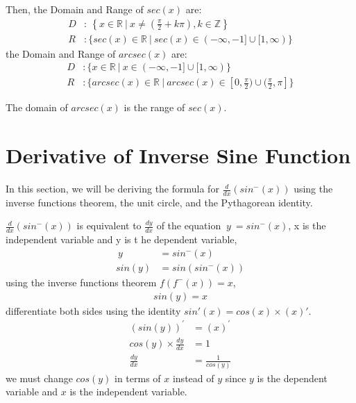 \documentclass[12pt, titlepage]{article}
\begin{document}
        Then, the Domain and Range of $\displaystyle sec( x)$ are:
            \begin{align*}
                D&:\ \left\{x\in \mathbb{R}\:|\:x\neq \left(\frac{\pi }{2} +k\pi \right) ,k\in \mathbb{Z}\right\}\\
                R&: \{sec(x)\in \mathbb{R}\:|\:sec(x)\in ( -\infty ,-1] \cup [ 1,\infty )\}
            \end{align*}
        the Domain and Range of $\displaystyle arcsec( x)$ are:
            \begin{align*}
                D&: \{x\in \mathbb{R}\:|\:x\in ( -\infty ,-1] \cup [ 1,\infty )\}\\
                R&: \{arcsec(x)\in \mathbb{R}\:|\:arcsec(x)\in [0,\frac{\pi}{2})\cup(\frac{\pi}{2},\pi]\}
            \end{align*}
            
        The domain of $arcsec(x)$ is the range of $sec(x)$.

\newpage
\section{Derivative of Inverse Sine Function}
    In this section, we will be deriving the formula for $\frac{d}{dx}(sin^-(x))$ using the inverse functions theorem, the unit circle, and the Pythagorean identity.

    $\displaystyle \frac{d}{dx}\left( sin^{-}( x)\right)$ is equivalent to $\displaystyle \frac{dy}{dx}$ of the equation $\displaystyle \ y\ =sin^{-}( x)$, x is the independent variable and y is t he dependent variable,
     \begin{align}
        \label{yisarcsin}
        \ y\ &=sin^{-}( x)\\
        sin( y) &=sin\left( sin^{-}( x)\right)
    \end{align}
    using the inverse functions theorem $\displaystyle f\left( f^{-}( x)\right) =x$,
    \begin{align}
        \label{eq:siny}
        sin(y)=x
    \end{align}
    differentiate both sides using the identity $\displaystyle sin'( x) =cos( x) \times ( x) '$.%
     \begin{align}
        ( sin( y))^{'} &=( x)^{'}\\
        cos( y) \times \frac{dy}{dx} &=1\\
        \frac{dy}{dx} &=\frac{1}{cos( y)}
    \end{align}
    we must change $cos(y)$ in terms of $x$ instead of $y$ since $y$ is the dependent variable and $x$ is the independent variable.
\end{document}

